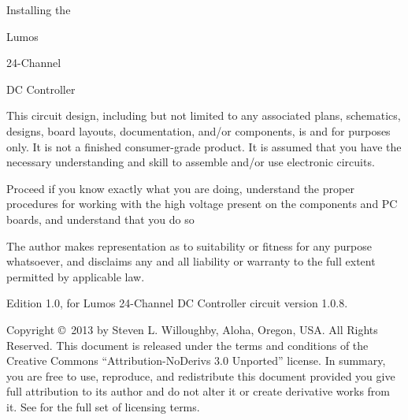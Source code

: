 \documentclass[letterpaper,twoside,onecolumn,openright,final]{memoir}
\begin{document}
\frontmatter

\thispagestyle{empty}
\vfill
\begin{center}
{\fontsize{48}{50}\selectfont
\strut Installing the \\\strut Lumos\TM\\\strut
24-Channel \\\strut DC Controller}

\vfill

\end{center}

\newpage
\begin{center}


\end{center}

This circuit design, including but not limited to any associated plans, schematics, designs, board layouts, documentation, 
and/or components, is  and for  purposes only. It is not a finished consumer-grade product.
It is assumed that you have the necessary understanding and skill to assemble and/or use electronic circuits.

Proceed  if you know exactly what you are doing, understand the proper procedures for working with the high voltage present on the components and PC boards, and understand that you do so 

The author makes  representation as to suitability or fitness for any purpose whatsoever, and disclaims any and all liability or warranty to the full extent permitted by applicable law.

\strut\vfill
\noindent Edition 1.0, for Lumos 24-Channel DC Controller circuit version 1.0.8.

\smallskip


\noindent Copyright \copyright\ 2013 by Steven L. Willoughby,
Aloha, Oregon, USA.  All Rights Reserved.  
This document is released under the terms and conditions of the 
Creative Commons ``Attribution-NoDerivs 3.0 Unported'' license.  
In summary, you are free to use, reproduce, and redistribute this 
document provided you give full attribution to its author and do not
alter it or create derivative works from it.  See
 for the full
set of licensing terms.
\end{document}
